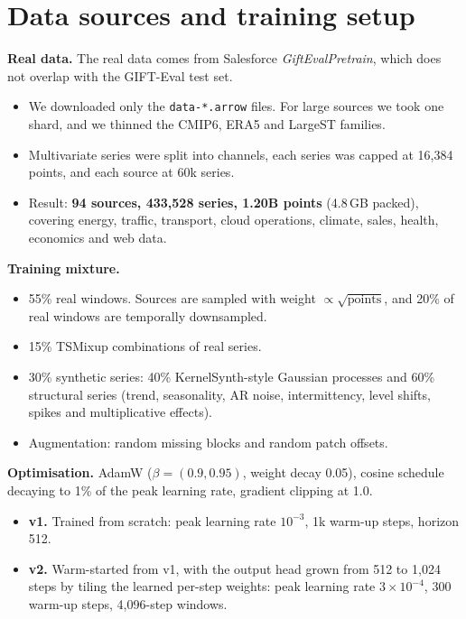 \documentclass[10pt,twocolumn]{extarticle}
\begin{document}
\section{Data sources and training setup}
\textbf{Real data.} The real data comes from Salesforce \emph{GiftEvalPretrain},
which does not overlap with the GIFT-Eval test set.
\begin{itemize}
\item We downloaded only the \texttt{data-*.arrow} files. For large sources we took
one shard, and we thinned the CMIP6, ERA5 and LargeST families.
\item Multivariate series were split into channels, each series was capped at
16{,}384 points, and each source at 60k series.
\item Result: \textbf{94 sources, 433{,}528 series, 1.20B points} (4.8\,GB packed),
covering energy, traffic, transport, cloud operations, climate, sales, health,
economics and web data.
\end{itemize}
\textbf{Training mixture.}
\begin{itemize}
\item 55\% real windows. Sources are sampled with weight $\propto\sqrt{\text{points}}$,
and 20\% of real windows are temporally downsampled.
\item 15\% TSMixup combinations of real series.
\item 30\% synthetic series: 40\% KernelSynth-style Gaussian processes and 60\%
structural series (trend, seasonality, AR noise, intermittency, level shifts,
spikes and multiplicative effects).
\item Augmentation: random missing blocks and random patch offsets.
\end{itemize}
\textbf{Optimisation.} AdamW ($\beta=(0.9,0.95)$, weight decay 0.05), cosine
schedule decaying to 1\% of the peak learning rate, gradient clipping at 1.0.
\begin{itemize}
\item \textbf{v1.} Trained from scratch: peak learning rate $10^{-3}$, 1k warm-up
steps, horizon 512.
\item \textbf{v2.} Warm-started from v1, with the output head grown from 512 to
1{,}024 steps by tiling the learned per-step weights: peak learning rate
$3\times10^{-4}$, 300 warm-up steps, 4{,}096-step windows.
\end{itemize}
\end{document}
